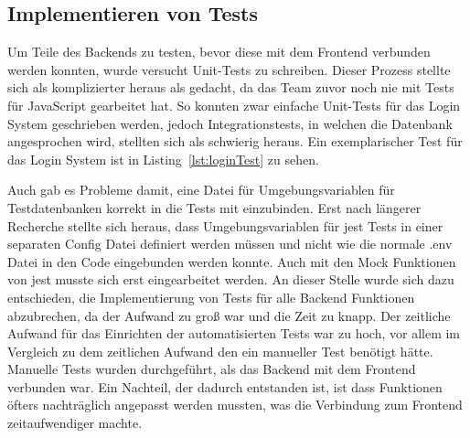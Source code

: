 \vspace{1em}

\vspace{1em}
\newpage

\subsection{Implementieren von Tests}\label{subsec:implementieren-von-tests}

Um Teile des Backends zu testen, bevor diese mit dem Frontend verbunden werden konnten, wurde versucht Unit-Tests zu schreiben.
Dieser Prozess stellte sich als komplizierter heraus als gedacht, da das Team zuvor noch nie mit Tests für JavaScript gearbeitet hat.
So konnten zwar einfache Unit-Tests für das Login System geschrieben werden, jedoch Integrationstests, in welchen die Datenbank angesprochen wird, stellten sich als schwierig heraus.
Ein exemplarischer Test für das Login System ist in Listing~\ref{lst:loginTest} zu sehen.

\vspace{1em}

\vspace{1em}

Auch gab es Probleme damit, eine Datei für Umgebungsvariablen für Testdatenbanken korrekt in die Tests mit einzubinden.
Erst nach längerer Recherche stellte sich heraus, dass Umgebungsvariablen für jest Tests in einer separaten Config Datei definiert werden müssen und nicht wie die normale .env Datei in den Code eingebunden werden konnte.
Auch mit den Mock Funktionen von jest musste sich erst eingearbeitet werden.
An dieser Stelle wurde sich dazu entschieden, die Implementierung von Tests für alle Backend Funktionen abzubrechen, da der Aufwand zu groß war und die Zeit zu knapp.
Der zeitliche Aufwand für das Einrichten der automatisierten Tests war zu hoch, vor allem im Vergleich zu dem zeitlichen Aufwand den ein manueller Test benötigt hätte.
Manuelle Tests wurden durchgeführt, als das Backend mit dem Frontend verbunden war.
Ein Nachteil, der dadurch entstanden ist, ist dass Funktionen öfters nachträglich angepasst werden mussten, was die Verbindung zum Frontend zeitaufwendiger machte.
